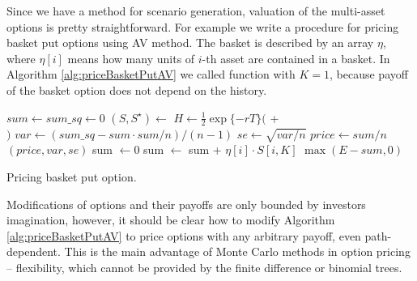 \documentclass[a4paper,11pt, twoside]{book}
\theoremstyle{definition}
\theoremstyle{remark}
\newcounter{example}[chapter]
\begin{document}
Since we have a method for scenario generation, valuation of the multi-asset options is pretty straightforward. For example we write a procedure for pricing basket put options using AV method. The basket is described by an array $\eta$, where $\eta[i]$ means how many units of $i$-th asset are contained in a basket. In Algorithm \ref{alg:priceBasketPutAV} we called function  with $K=1$, because payoff of the basket option does not depend on the history. 

\begin{algorithm}[!ht]
 \begin{algorithmic}[1]
  \State  $sum \gets sum\_sq \gets 0$
    \State $(S, S^\star) \gets$ 
    \State $H \gets \frac{1}{2}\exp\{-rT\} ($  +\\ 
    \hspace{132pt}  $)$
  \EndFor
  \State $var \gets (sum\_sq - sum \cdot sum/n) / (n-1)$
  \State $se \gets \sqrt{var / n}$
  \State $price \gets sum / n$
  \State \Return $(price, var, se)$
  \EndFunction
    \State sum $\gets 0$
      \State sum $\gets$ sum + $\eta[i]\cdot S[i, K]$
    \EndFor
    \State \Return $\max(E - sum, 0)$
  \EndFunction
 \end{algorithmic}
 \caption{Pricing basket put option.}
 \label{alg:priceBasketPutAV}
\end{algorithm}


Modifications of options and their payoffs are only bounded by investors imagination, however, it should be clear how to modify Algorithm \ref{alg:priceBasketPutAV} to price options with any arbitrary payoff, even path-dependent. This is the main advantage of Monte Carlo methods in option pricing -- flexibility, which cannot be provided by the finite difference or binomial trees.
\end{document}
